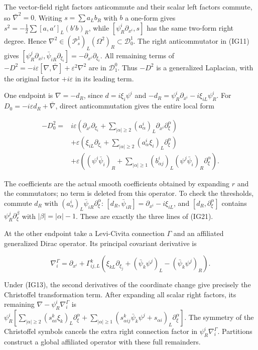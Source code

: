 \documentclass[
  11pt,
]{article}
\begin{document}
The vector-field right factors anticommute and their scalar left factors
commute, so \(\bar\nabla^2=0\). Writing \(s=\sum a_Lb_R\) with \(b\) a
one-form gives \(s^2=-\frac12\sum[a,a']_L(b'b)_R\), while
\([\psi_R^i\partial_{x^i},s]\) has the same two-form right degree. Hence
\(\nabla^2\in(\mathcal P_s^1)_L(\Omega^2)_R\subset\mathcal D^1_0\). The
right anticommutator in (IG11) gives
\([\psi_R^j\partial_{x^j},\bar\psi_{iR}\partial_{\xi_i}]=-\partial_{x^i}\partial_{\xi_i}\).
All remaining terms of
\(-D^2=-i\varepsilon[\nabla,\bar\nabla]+\varepsilon^2\nabla^2\) are in
\(\mathcal D^0_1\). Thus \(-D^2\) is a generalized Laplacian, with the
original factor \(+i\varepsilon\) in its leading term.

One endpoint is \(\nabla=-d_R\), since \(d=i\xi_i\psi^i\) and
\(-d_R=\psi_R^i\partial_{x^i}-i\xi_{iL}\psi_R^i\). For
\(D_0=-i\varepsilon d_R+\bar\nabla\), direct anticommutation gives the
entire local form

\[
\begin{split}
 -D_0^2={}&i\varepsilon\left(
 \partial_{x^i}\partial_{\xi_i}
 +\sum_{|\alpha|\geq2}(a^i_\alpha)_L
                   \partial_{x^i}\partial_\xi^\alpha\right)\\
 &+\varepsilon\left(\xi_{iL}\partial_{\xi_i}
 +\sum_{|\alpha|\geq2}(a^i_\alpha\xi_i)_L
                                  \partial_\xi^\alpha\right)\\
 &+\varepsilon\left((\psi^i\bar\psi_i)_R
 +\sum_{|\alpha|\geq1}(b^i_{\alpha j})_L
                   (\psi^j\bar\psi_i)_R\partial_\xi^\alpha\right).
\end{split}
\tag{IG21}
\]

The coefficients are the actual smooth coefficients obtained by
expanding \(r\) and the commutators; no term is deleted from this
operator. To check the thresholds, commute \(d_R\) with
\((a^i_\alpha)_L\bar\psi_{iR}\partial_\xi^\alpha\):
\([d_R,\bar\psi_{iR}]=\partial_{x^i}-i\xi_{iL}\), and
\([d_R,\partial_\xi^\alpha]\) contains \(\psi_R^j\partial_\xi^\beta\)
with \(|\beta|=|\alpha|-1\). These are exactly the three lines of
(IG21).

At the other endpoint take a Levi-Civita connection \(\Gamma\) and an
affiliated generalized Dirac operator. Its principal covariant
derivative is

\[
 \nabla_i^\Gamma=\partial_{x^i}
 +\Gamma^k_{ij,L}\left(
       \xi_{kL}\partial_{\xi_j}
       +(\bar\psi_k\psi^j)_L-(\bar\psi_k\psi^j)_R\right).
\tag{IG22}
\]

Under (IG13), the second derivatives of the coordinate change give
precisely the Christoffel transformation term. After expanding all
scalar right factors, its remaining \(\nabla-\psi_R^i\nabla_i^\Gamma\)
is
\(\psi_R^i[\sum_{|\alpha|\geq2}(s^k_{\alpha i}\xi_k)_L\partial_\xi^\alpha+\sum_{|\alpha|\geq1}(s^k_{\alpha ij}\bar\psi_k\psi^j+s_{\alpha i})_L\partial_\xi^\alpha]\).
The symmetry of the Christoffel symbols cancels the extra right
connection factor in \(\psi_R^i\nabla_i^\Gamma\). Partitions construct a
global affiliated operator with these full remainders.
\end{document}
